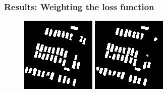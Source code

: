 \documentclass[aspectratio=1610]{beamer}
\begin{document}
\begin{frame}
  \frametitle{\hfill Results: Weighting the loss function}
\begin{figure}[H]
  \includegraphics[width=\linewidth]{class_vs_w/label_1}
\endminipage\hfill
{}
  \includegraphics[width=\linewidth]{class_vs_w/un_weight_1}

\end{figure}
\end{frame}
\end{document}
